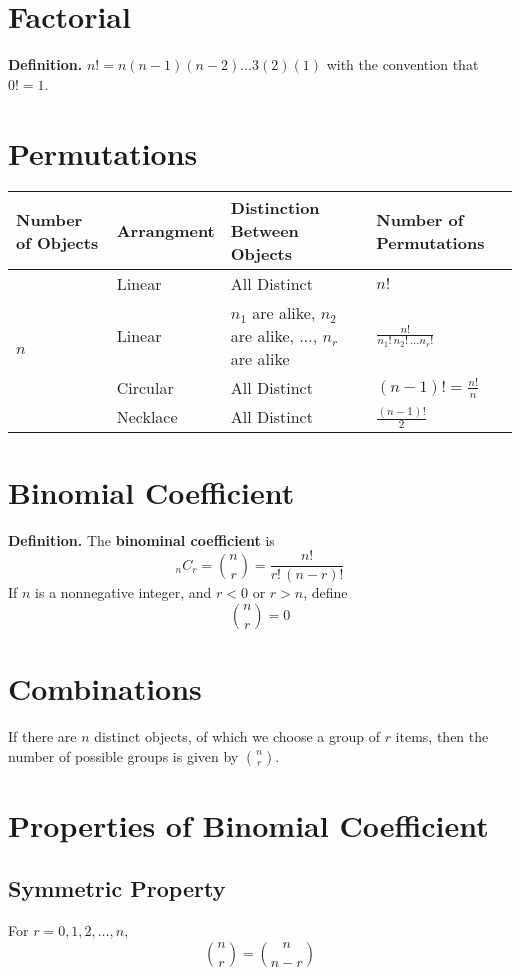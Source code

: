 \documentclass[../st2131_notes.tex]{subfiles}
\begin{document}
\section{Factorial}
\textbf{Definition.} \(n!=n(n-1)(n-2)\ldots3(2)(1)\) with the convention that \(0!=1\).

\section{Permutations}
\def\arraystretch{1.7}
\begin{tabular}{|p{2.5cm}|p{2.5cm}|p{6cm}|p{5.2cm}|}
\hline
\textbf{Number of Objects} & \textbf{Arrangment} & \textbf{Distinction Between Objects} & \textbf{Number of Permutations} \\
\hline
\multirow{4}{*}{\(n\)} & Linear & All Distinct & \(n!\) \\
\cline{2-4}
& Linear & \(n_1\) are alike, \(n_2\) are alike, \(\ldots\), \(n_r\) are alike & \(\displaystyle\frac{n!}{n_1!\,n_2!\,\ldots n_r!}\) \\
\cline{2-4}
& Circular & All Distinct & \(\displaystyle(n-1)!=\frac{n!}{n}\) \\
\cline{2-4}
& Necklace & All Distinct & \(\displaystyle\frac{(n-1)!}{2}\) \\
\hline
\end{tabular}

\section{Binomial Coefficient}
\textbf{Definition.} The \textbf{binominal coefficient} is
\[_nC_r=\binom{n}{r}=\frac{n!}{r!\,(n-r)!}\]
If \(n\) is a nonnegative integer, and \(r<0\) or \(r>n\), define
\[\binom{n}{r}=0\]

\section{Combinations}
If there are \(n\) distinct objects, of which we choose a group of \(r\) items, then the number of possible groups is given by \(\displaystyle\binom{n}{r}\).

\section{Properties of Binomial Coefficient}
\subsection{Symmetric Property}
For \(r=0,1,2,\ldots,n\),
\[\binom{n}{r}=\binom{n}{n-r}\]
\end{document}
